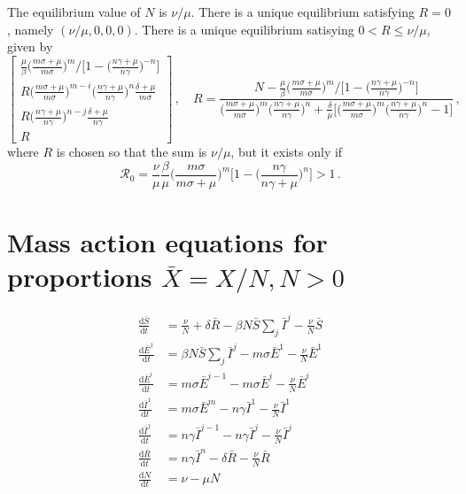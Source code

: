 \documentclass[fleqn]{article}
\begin{document}
The equilibrium value of $N$ is $\nu / \mu$.
There is a unique equilibrium satisfying $R = 0$,
namely $(\nu / \mu, 0, 0, 0)$.
There is a unique equilibrium satisying $0 < R \leq \nu / \mu$, given by
\begin{equation}
\begin{bmatrix}
  \frac{\mu}{\beta} \big(\frac{m \sigma + \mu}{m \sigma}\big)^{m} \big/ \big[1 - \big(\frac{n \gamma + \mu}{n \gamma}\big)^{-n}\big] \\
  R \big(\frac{m \sigma + \mu}{m \sigma}\big)^{m - i} \big(\frac{n \gamma + \mu}{n \gamma}\big)^{n} \frac{\delta + \mu}{m \sigma} \\
  R \big(\frac{n \gamma + \mu}{n \gamma}\big)^{n - j} \frac{\delta + \mu}{n \gamma} \\
  R
\end{bmatrix}
\,,\quad
R = \frac{N - \frac{\mu}{\beta} \big(\frac{m \sigma + \mu}{m \sigma}\big)^{m} \big/ \big[1 - \big(\frac{n \gamma + \mu}{n \gamma}\big)^{-n}\big]}{\big(\frac{m \sigma + \mu}{m \sigma}\big)^{m} \big(\frac{n \gamma + \mu}{n \gamma}\big)^{n} + \frac{\delta}{\mu} \big[\big(\frac{m \sigma + \mu}{m \sigma}\big)^{m} \big(\frac{n \gamma + \mu}{n \gamma}\big)^{n} - 1\big]}\,,
\end{equation}
where $R$ is chosen so that the sum is $\nu / \mu$, but it exists only if
\begin{equation}
\mathcal{R}_{0} = \frac{\nu}{\mu} \frac{\beta}{\mu} \Big(\frac{m \sigma}{m \sigma + \mu}\Big)^{m} \Big[1 - \Big(\frac{n \gamma}{n \gamma + \mu}\Big)^{n}\Big] > 1\,.
\end{equation}
\clearpage


\section{Mass action equations for proportions $\bar{X} = X/N, N > 0$}

\begin{subequations}
\begin{align}
  \frac{\text{d} \bar{S}    }{\text{d} t}
  &= \frac{\nu}{N} + \delta \bar{R} - \beta N \bar{S} \sum\nolimits_{j} \bar{I}^{j} - \frac{\nu}{N} \bar{S} \\
  \frac{\text{d} \bar{E}^{1}}{\text{d} t}
  &= \beta N \bar{S} \sum\nolimits_{j} \bar{I}^{j} - m \sigma \bar{E}^{1} - \frac{\nu}{N} \bar{E}^{1} \\
  \frac{\text{d} \bar{E}^{i}}{\text{d} t}
  &= m \sigma \bar{E}^{i-1} - m \sigma \bar{E}^{i} - \frac{\nu}{N} \bar{E}^{i} \\
  \frac{\text{d} \bar{I}^{1}}{\text{d} t}
  &= m \sigma \bar{E}^{m} - n \gamma \bar{I}^{1} - \frac{\nu}{N} \bar{I}^{1} \\
  \frac{\text{d} \bar{I}^{j}}{\text{d} t}
  &= n \gamma \bar{I}^{j-1} - n \gamma \bar{I}^{j} - \frac{\nu}{N} \bar{I}^{j} \\
  \frac{\text{d} \bar{R}    }{\text{d} t}
  &= n \gamma \bar{I}^{n} - \delta \bar{R} - \frac{\nu}{N} \bar{R} \\
  \frac{\text{d}      N     }{\text{d} t}
  &= \nu - \mu N
\end{align}
\end{subequations}
\end{document}

